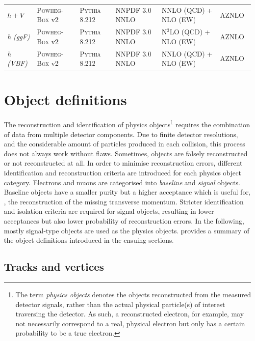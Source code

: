 \begin{table}
{\begin{tabular} {llllll}
	$h+V$ & \textsc{Powheg-Box} v2 & \textsc{Pythia} 8.212 & NNPDF 3.0 NNLO & NNLO (QCD) + NLO (EW)~\cite{deFlorian:2016spz} & AZNLO~\cite{ATL-PHYS-PUB-2013-017} \\
	\textit{h (ggF)} & \textsc{Powheg-Box} v2 & \textsc{Pythia} 8.212 & NNPDF 3.0 NNLO & N$^3$LO (QCD) + NLO (EW)~\cite{deFlorian:2016spz} & AZNLO \\
	\textit{h (VBF)} & \textsc{Powheg-Box} v2 & \textsc{Pythia} 8.212 & NNPDF 3.0 NNLO & NNLO (QCD) + NLO (EW)~\cite{deFlorian:2016spz} & AZNLO \\
	\bottomrule
	\end{tabular}}\vspace{2mm}
	\label{tab:mc_generators}   
\end{table}

\section{Object definitions}\label{sec:object_definitions}

The reconstruction and identification of physics objects\footnote{The term \textit{physics objects} denotes the objects reconstructed from the measured detector signals, rather than the actual physical particle(s) of interest traversing the detector. As such, a reconstructed electron, for example, may not necessarily correspond to a real, physical electron but only has a certain probability to be a true electron.} requires the combination of data from multiple detector components.
Due to finite detector resolutions, and the considerable amount of particles produced in each collision, this process does not always work without flaws.
Sometimes, objects are falsely reconstructed or not reconstructed at all. In order to minimise reconstruction errors, different identification and reconstruction criteria are introduced for each physics object category. Electrons and muons are categorised into \textit{baseline} and \textit{signal} objects.
Baseline objects have a smaller purity but a higher acceptance which is useful for, \eg, the reconstruction of the missing transverse momentum. Stricter identification and isolation criteria are required for signal objects, resulting in lower acceptances but also lower probability of reconstruction errors.
In the following, mostly signal-type objects are used as the physics objects.  provides a summary of the object definitions introduced in the ensuing sections.

\subsection{Tracks and vertices}\label{sec:reco_tracks}

